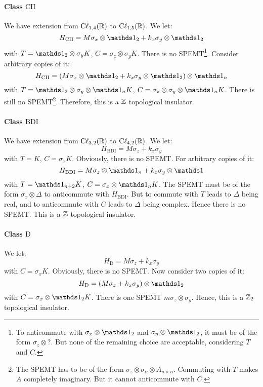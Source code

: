 \paragraph{Class $\mathrm{CII}$} We have extension from
$\mathrm{C\ell}_{1,4}(\mathbb{R})$ to $\mathrm{C\ell}_{1,5}(\mathbb{R})$.
We let:
\begin{equation}
    H_{\mathrm{CII}} = M\sigma_x\otimes\id_2 + k_x\sigma_y\otimes\id_2
\end{equation}
with $T=\id_2\otimes\sigma_y K$, $C=\sigma_z\otimes\sigma_y K$. There is no
SPEMT\footnote{To anticommute with $\sigma_x\otimes\id_2$ and
$\sigma_y\otimes\id_2$, it must be of the form $\sigma_z\otimes?$. But none of
the remaining choice are acceptable, considering $T$ and $C$.}. Consider
arbitrary copies of it:
\begin{equation}
    H_{\mathrm{CII}} = (M\sigma_x\otimes\id_2 +
    k_x\sigma_y\otimes\id_2)\otimes\id_n
\end{equation}
with $T=\id_2\otimes\sigma_y\otimes\id_n K$,
$C=\sigma_z\otimes\sigma_y\otimes\id_n K$. There is still no SPEMT\footnote{The
SPEMT has to be of the form $\sigma_z\otimes\sigma_\alpha\otimes A_{n\times n}$.
Commuting with $T$ makes $A$ completely imaginary. But it cannot anticommute
with $C$.}. Therefore, this is a $\mathbb{Z}$ topological insulator.

\paragraph{Class $\mathrm{BDI}$} We have extension from
$\mathrm{C\ell}_{3,2}(\mathbb{R})$ to $\mathrm{C\ell}_{4,2}(\mathbb{R})$. We let:
\begin{equation}
    H_{\mathrm{BDI}} = M\sigma_z + k_x \sigma_y
\end{equation}
with $T=K$, $C=\sigma_x K$. Obviously, there is no SPEMT. For arbitrary copies
of it:
\begin{equation}
    H_{\mathrm{BDI}} = M\sigma_z\otimes\id_n + k_x \sigma_y\otimes\id
\end{equation}
with $T=\id_{n+2}K$, $C=\sigma_x\otimes\id_n K$.  The SPEMT must be of the form
$\sigma_x\otimes\Delta$ to anticommute with $H_{\mathrm{BDI}}$. But to commute with
$T$ leads to $\Delta$ being real, and to anticommute with $C$ leads to $\Delta$ being
complex. Hence there is no SPEMT. This is a $\mathbb{Z}$ topological insulator.

\paragraph{Class $\mathrm{D}$} We let:
\begin{equation}
    H_{\mathrm{D}} = M\sigma_z + k_x \sigma_y
\end{equation}
with $C=\sigma_x K$. Obviously, there is no SPEMT. Now consider two copies of
it:
\begin{equation}
    H_{\mathrm{D}} = (M\sigma_z + k_x \sigma_y)\otimes\id_2
\end{equation}
with $C=\sigma_x\otimes\id_2 K$. There is one SPEMT $m \sigma_z\otimes\sigma_y$.
Hence, this is a $\mathbb{Z}_2$ topological insulator.

